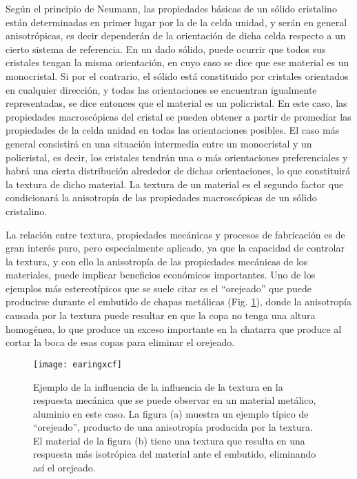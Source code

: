 Según el principio de Neumann\cite{nye1985physical}, las propiedades básicas de un sólido cristalino están determinadas en primer lugar por la de la celda unidad, y serán en general anisotrópicas, es decir dependerán de la orientación de dicha celda respecto a un cierto sistema de referencia.
En un dado sólido, puede ocurrir que todos sus cristales tengan la misma orientación, en cuyo caso se dice que ese material es un monocristal.
Si por el contrario, el sólido está constituido por cristales orientados en cualquier dirección, y todas las orientaciones se encuentran igualmente representadas, se dice entonces que el material es un policristal.
En este caso, las propiedades macroscópicas del cristal se pueden obtener a partir de promediar las propiedades de la celda unidad en todas las orientaciones posibles.
El caso más general consistirá en una situación intermedia entre un monocristal y un policristal, es decir, los cristales tendrán una o más orientaciones preferenciales y habrá una cierta distribución alrededor de dichas orientaciones, lo que constituirá la textura de dicho material. 
La textura de un material es el segundo factor que condicionará la anisotropía de las propiedades macroscópicas de un sólido cristalino.

La relación entre textura, propiedades mecánicas y procesos de fabricación es de gran interés puro, pero especialmente aplicado, ya que la capacidad de controlar la textura, y con ello la anisotropía de las propiedades mecánicas de los materiales, puede implicar beneficios económicos importantes.
Uno de los ejemplos más estereotípicos que se suele citar es el ``orejeado'' que puede producirse durante el embutido de chapas metálicas (Fig. \ref{fig:earing}), donde la anisotropía causada por la textura puede resultar en que la copa no tenga una altura homogénea, lo que produce un exceso importante en la chatarra que produce al cortar la boca de esas copas para eliminar el orejeado.

\begin{figure}[h!]
  \centering
  \texttt{[image: earingxcf]}
  \caption{Ejemplo de la influencia de la influencia de la textura en la respuesta mecánica que se puede observar en un material metálico, aluminio en este caso. La figura (a) muestra un ejemplo típico de ``orejeado'', producto de una anisotropía producida por la textura. El material de la figura (b) tiene una textura que resulta en una respuesta más isotrópica del material ante el embutido, eliminando así el orejeado. }
  \label{fig:earing}
\end{figure}

